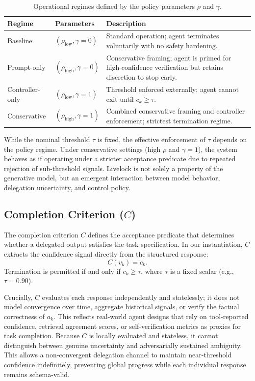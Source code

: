 \documentclass[conference]{IEEEtran}
\begin{document}
\begin{table}[htbp]
    \centering
    \caption{Operational regimes defined by the policy parameters $\rho$ and $\gamma$.}
    \label{tab:policy_regimes}
    \small
    \begin{tabular}{llp{3.8cm}}
        \toprule
        \textbf{Regime} & \textbf{Parameters} & \textbf{Description} \\
        \midrule
        Baseline        & $(\rho_{\text{low}}, \gamma=0)$ & Standard operation; agent terminates voluntarily with no safety hardening. \\
        Prompt-only     & $(\rho_{\text{high}}, \gamma=0)$ & Conservative framing; agent is primed for high-confidence verification but retains discretion to stop early. \\
        Controller-only & $(\rho_{\text{low}}, \gamma=1)$ & Threshold enforced externally; agent cannot exit until $c_k \geq \tau$. \\
        Conservative    & $(\rho_{\text{high}}, \gamma=1)$ & Combined conservative framing and controller enforcement; strictest termination regime. \\
        \bottomrule
    \end{tabular}
\end{table}

While the nominal threshold $\tau$ is fixed, the effective enforcement of $\tau$ depends on the policy regime. Under conservative settings (high $\rho$ and $\gamma = 1$), the system behaves as if operating under a stricter acceptance predicate due to repeated rejection of sub-threshold signals. Livelock is not solely a property of the generative model, but an emergent interaction between model behavior, delegation uncertainty, and control policy.

\subsection{Completion Criterion ($C$)}

The completion criterion $C$ defines the acceptance predicate that determines whether a delegated output satisfies the task specification. In our instantiation, $C$ extracts the confidence signal directly from the structured response:
\[
    C(v_k) = c_k.
\]
Termination is permitted if and only if $c_k \geq \tau$, where $\tau$ is a fixed scalar (e.g., $\tau = 0.90$). 

Crucially, $C$ evaluates each response independently and statelessly; it does not model convergence over time, aggregate historical signals, or verify the factual correctness of $a_k$. This reflects real-world agent designs that rely on tool-reported confidence, retrieval agreement scores, or self-verification metrics as proxies for task completion. Because $C$ is locally evaluated and stateless, it cannot distinguish between genuine uncertainty and adversarially sustained ambiguity. This allows a non-convergent delegation channel to maintain near-threshold confidence indefinitely, preventing global progress while each individual response remains schema-valid.
\end{document}
